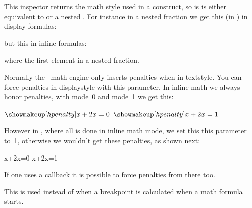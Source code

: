 \stopoldprimitive

\startnewprimitive[title={\prm {mathparentstyle}}]

This inspector returns the math style used in a construct, so is is either
equivalent to  or a nested . For instance
in a nested fraction we get this (in \CONTEXT) in display formulas:

\def\foo{(\the\mathmainstyle,\the\mathparentstyle,\the\mathstyle)}

\dm{
    \frac{\frac{\foo}{\foo}}{\frac{\foo}{\foo}} + \foo
}

but this in inline formulas:

\im{
    \frac{\frac{\foo}{\foo}}{\frac{\foo}{\foo}} + \foo
}

where the first element in a nested fraction.

\stopnewprimitive

\startnewprimitive[title={\prm {mathpenaltiesmode}}]

Normally the \TEX\ math engine only inserts penalties when in textstyle. You can
force penalties in displaystyle with this parameter. In inline math we always
honor penalties, with mode~0 and mode~1 we get this:

\pushoverloadmode

\startlines
{ \let\mathpenaltiesmode\scratchcounter $\showmakeup[hpenalty]x+2x=0$}
{ \let\mathpenaltiesmode\scratchcounter $\showmakeup[hpenalty]x+2x=1$}
\stoplines

However in \CONTEXT, where all is done in inline math mode, we set this this
parameter to~1, otherwise we wouldn't get these penalties, as shown next:

{ \let\mathpenaltiesmode\scratchcounter \startformula \showmakeup[hpenalty]x+2x=0 \stopformula}
{ \let\mathpenaltiesmode\scratchcounter \startformula \showmakeup[hpenalty]x+2x=1 \stopformula}

\popoverloadmode

If one uses a callback it is possible to force penalties from there too.

\stopnewprimitive

\startnewprimitive[title={\prm {mathpretolerance}}]

This is used instead of  when a breakpoint is calculated when
a math formula starts.

\stopnewprimitive

\startoldprimitive[title={\prm {mathpunct}}]

